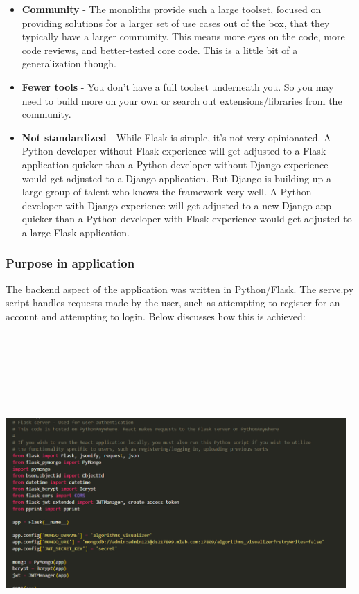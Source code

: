 \begin{itemize}
    \item \textbf{Community} - The monoliths provide such a large toolset,
    focused on providing solutions for a larger set of use cases out of the box,
    that they typically have a larger community. This means more eyes on the
    code, more code reviews, and better-tested core code. This is a little bit
    of a generalization though.
    \item \textbf{Fewer tools} -  You don’t have a full toolset underneath you.
    So you may need to build more on your own or search out extensions/libraries
    from the community.
    \item \textbf{Not standardized} - While Flask is simple, it’s
    not very opinionated. A Python developer without Flask experience will get 
    adjusted to a Flask application quicker than a Python developer without 
    Django experience would get adjusted to a Django application. But Django is 
    building up a large group of talent who knows the framework very well. A 
    Python developer with Django experience will get adjusted to a new Django 
    app quicker than a Python developer with Flask experience would get adjusted
    to a large Flask application.
\end{itemize}

\newpage
\subsubsection{Purpose in application}
The backend aspect of the application was written in Python/Flask. The serve.py script handles requests made by the user, such as attempting to register for an account and attempting to login. Below discusses how this is achieved:

\begin{center}
    \includegraphics[width=13cm,height=13cm,keepaspectratio]{images/backend1}
\end{center}

